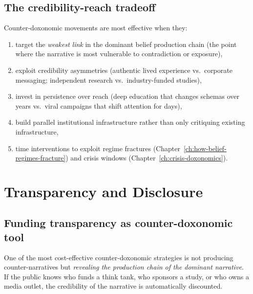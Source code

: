 \subsection{The credibility-reach tradeoff}

\begin{proposition}
\label{prop:asymmetric}
Counter-doxonomic movements are most effective when they:
\begin{enumerate}[nosep]
  \item target the \emph{weakest link} in the dominant belief production chain (the point where the narrative is most vulnerable to contradiction or exposure),
  \item exploit credibility asymmetries (authentic lived experience vs.\ corporate messaging; independent research vs.\ industry-funded studies),
  \item invest in persistence over reach (deep education that changes schemas over years vs.\ viral campaigns that shift attention for days),
  \item build parallel institutional infrastructure rather than only critiquing existing infrastructure,
  \item time interventions to exploit regime fractures (Chapter~\ref{ch:how-belief-regimes-fracture}) and crisis windows (Chapter~\ref{ch:crisis-doxonomics}).
\end{enumerate}
\end{proposition}

\section{Transparency and Disclosure}
\label{sec:ch31-transparency}

\subsection{Funding transparency as counter-doxonomic tool}

One of the most cost-effective counter-doxonomic strategies is not producing counter-narratives but \emph{revealing the production chain of the dominant narrative}.
If the public knows who funds a think tank, who sponsors a study, or who owns a media outlet, the credibility of the narrative is automatically discounted.

